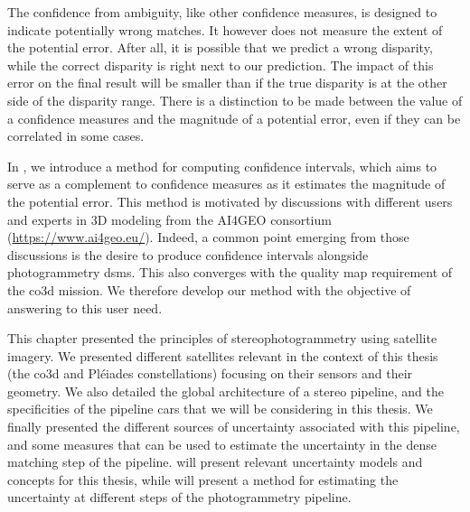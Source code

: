 The confidence from ambiguity, like other confidence measures, is designed to indicate potentially wrong matches. It however does not measure the extent of the potential error. After all, it is possible that we predict a wrong disparity, while the correct disparity is right next to our prediction. The impact of this error on the final result will be smaller than if the true disparity is at the other side of the disparity range. There is a distinction to be made between the value of a confidence measures and the magnitude of a potential error, even if they can be correlated in some cases.

In , we introduce a method for computing confidence intervals, which aims to serve as a complement to confidence measures as it estimates the magnitude of the potential error. This method is motivated by discussions with different users and experts in 3D modeling from the AI4GEO consortium (\url{https://www.ai4geo.eu/}). Indeed, a common point emerging from those discussions is the desire to produce confidence intervals alongside photogrammetry \acrshort{dsm}s. This also converges with the quality map requirement of the \acrshort{co3d} mission. We therefore develop our method with the objective of answering to this user need.

\begin{conclusion}
This chapter presented the principles of stereophotogrammetry using satellite imagery. We presented different satellites relevant in the context of this thesis (\ie the \acrshort{co3d} and Pléiades constellations) focusing on their sensors and their geometry. We also detailed the global architecture of a stereo pipeline, and the specificities of the pipeline \acrshort{cars} that we will be considering in this thesis. We finally presented the different sources of uncertainty associated with this pipeline, and some measures that can be used to estimate the uncertainty in the dense matching step of the pipeline.  will present relevant uncertainty models and concepts for this thesis, while  will present a method for estimating the uncertainty at different steps of the photogrammetry pipeline.
\end{conclusion}

\clearpage